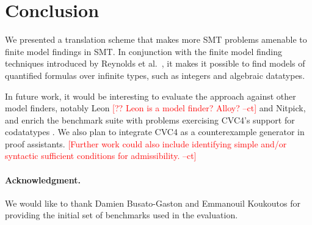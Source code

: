 \documentclass[runningheads,a4paper]{llncs}
\newcommand\cvc{CVC4\xspace}
\newcommand\concret{\gamma} %
\newcommand{\rem}[1]{\textcolor{red}{[#1]}}
\newcommand{\ct}[1]{\rem{#1 --ct}}
\begin{document}



%
%
%

\section{Conclusion}
\label{sec:conclusion}

We presented a translation scheme that makes more SMT problems amenable to
finite model findings in SMT. In conjunction with the finite model finding
techniques introduced by Reynolds et al.\
\cite{ReyEtAl-1-RR-13,reynolds-et-al-2013}, it makes it possible to
find models of quantified formulas over infinite types, such as integers
and algebraic datatypes.

In future work, it would be interesting to evaluate the approach against other
model finders, notably Leon \ct{?? Leon is a model finder? Alloy?} and Nitpick, and enrich the benchmark suite with
problems exercising \cvc's support for codatatypes
\cite{reynolds-blanchette-2015-codata}. We also plan to integrate \cvc as a
counterexample generator in proof assistants.
\ct{Further work could also include identifying simple and/or syntactic sufficient conditions for admissibility. }

{%
\def\ackname{Acknowledgment}
\paragraph{%
\ackname.}
We would like to thank Damien Busato-Gaston and Emmanouil Koukoutos for
providing the initial set of benchmarks used in the evaluation.
}



{


}
\end{document}

